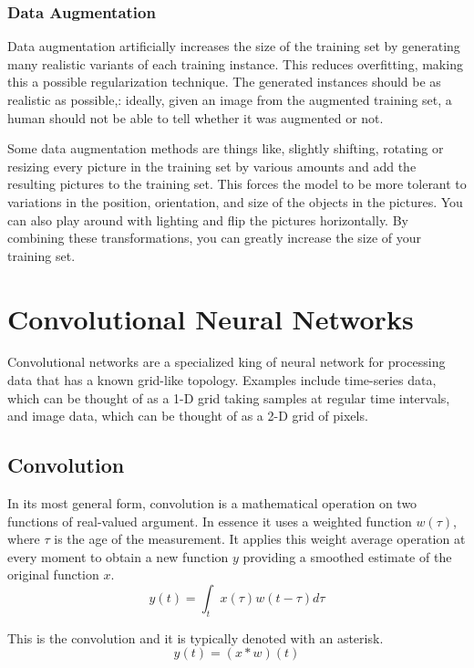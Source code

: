 \documentclass[12pt]{article}
\begin{document}
        \subsubsection{Data Augmentation} \label{sec:DataAugmentation}
            Data augmentation artificially increases the size of the training set by generating many realistic variants
            of each training instance. This reduces overfitting, making this a possible regularization technique. The
            generated instances should be as realistic as possible,: ideally, given an image from the augmented
            training set, a human should not be able to tell whether it was augmented or not. 

            Some data augmentation methods are things like, slightly shifting, rotating or resizing every picture in the
            training set by various amounts and add the resulting pictures to the training set. This forces the model to
            be more tolerant to variations in the position, orientation, and size of the objects in the pictures. You
            can also play around with lighting and flip the pictures horizontally. By combining these transformations,
            you can greatly increase the size of your training set.

\section{Convolutional Neural Networks} \label{sec:CNN}
    Convolutional networks are a specialized king of neural network for processing data that has a known grid-like
    topology. Examples include time-series data, which can be thought of as a 1-D grid taking samples at regular time
    intervals, and image data, which can be thought of as a 2-D grid of pixels. 

    \subsection{Convolution}
        In its most general form, convolution is a mathematical operation on two functions of real-valued argument. In
        essence it uses a weighted function $w(\tau)$, where $\tau$ is the age of the measurement. It applies this weight
        average operation at every moment to obtain a new function $y$ providing a smoothed estimate of the original
        function $x$.
        $$ y(t) = \int_t x(\tau)w(t - \tau)d\tau $$

        This is the convolution and it is typically denoted with an asterisk.
        $$ y(t) = (x * w)(t) $$
\end{document}
